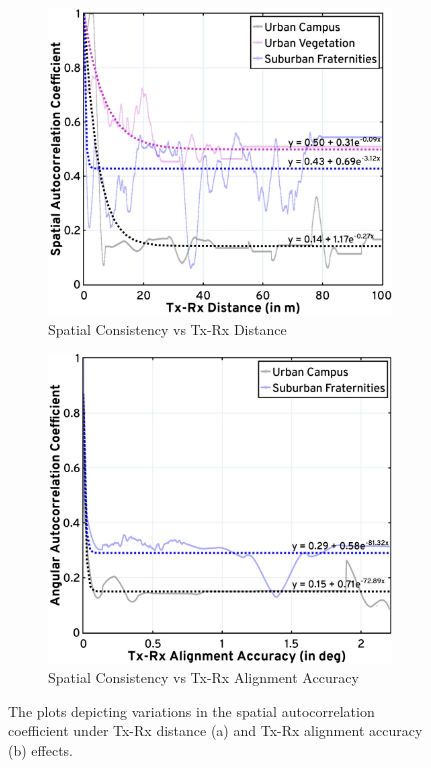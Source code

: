 \documentclass[12pt, draftcls, onecolumn]{IEEEtran}
\begin{document}
\begin{figure} [t]
     \centering
     \begin{subfigure}{0.497\linewidth}
         \centering
         \includegraphics[width=1.0\linewidth]{figs/sc_distance_updated.jpg}
         \caption{Spatial Consistency vs Tx-Rx Distance}
         \label{F8a}
     \end{subfigure}
     \begin{subfigure}{0.493\linewidth}
         \centering
         \includegraphics[width=1.0\linewidth]{figs/sc_alignment_updated.jpg}
         \caption{Spatial Consistency vs Tx-Rx Alignment Accuracy}
         \label{F8b}
     \end{subfigure}
     \vspace{-2mm}
     \caption{The plots depicting variations in the spatial autocorrelation coefficient under Tx-Rx distance (a) and Tx-Rx alignment accuracy (b) effects.}
     \label{F8}
\end{figure}
\vspace{-3mm}
\end{document}
